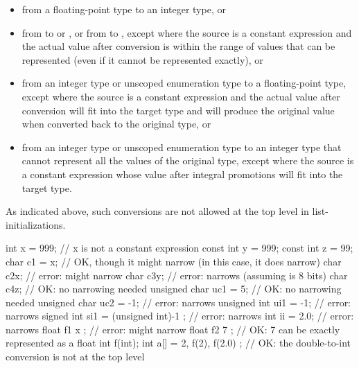 \begin{itemize}
\item from a floating-point type to an integer type, or

\item from  to  or , or from
 to , except where the source is a constant expression and
the actual value after conversion
is within the range of values that can be represented (even if it cannot be represented exactly),
or

\item from an integer type or unscoped enumeration type to a floating-point type, except
where the source is a constant expression and the actual value after conversion will fit
into the target type and will produce the original value when converted back to the
original type, or

\item from an integer type or unscoped enumeration type to an integer type that cannot
represent all the values of the original type, except where the source is a constant
expression whose value after integral promotions will fit into the target type.
\end{itemize}

\enternote As indicated above, such conversions are not allowed at the top level in
list-initializations.\exitnote \enterexample

\begin{codeblock}
int x = 999;              // x is not a constant expression
const int y = 999;
const int z = 99;
char c1 = x;              // OK, though it might narrow (in this case, it does narrow)
char c2{x};               // error: might narrow
char c3{y};               // error: narrows (assuming  is 8 bits)
char c4{z};               // OK: no narrowing needed
unsigned char uc1 = {5};  // OK: no narrowing needed
unsigned char uc2 = {-1}; // error: narrows
unsigned int ui1 = {-1};  // error: narrows
signed int si1 =
  { (unsigned int)-1 };   // error: narrows
int ii = {2.0};           // error: narrows
float f1 { x };           // error: might narrow
float f2 { 7 };           // OK: 7 can be exactly represented as a float
int f(int);
int a[] =
  { 2, f(2), f(2.0) };    // OK: the double-to-int conversion is not at the top level
\end{codeblock}
\exitexample%
%
%
